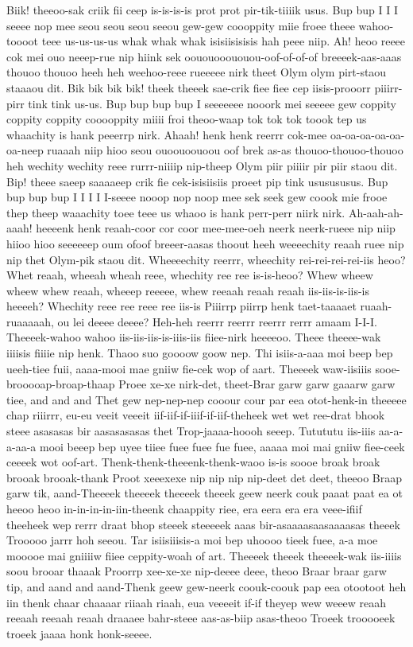 \documentclass[12pt,a4paper]{article}
\begin{document}
\begin{drama}
\pistspeaks
Biik! theeoo-sak criik fii ceep is-is-is-is prot prot pir-tik-tiiiik usus. Bup bup I I I seeee nop mee seou seou seou seeou gew-gew coooppity miie froee theee wahoo-toooot teee us-us-us-us whak whak whak isisiisisisis hah peee niip. Ah! heoo reeee cok mei ouo neeep-rue nip hiink sek oououooououou-oof-of-of-of breeeek-aas-aaas thouoo thouoo heeh heh weehoo-reee rueeeee nirk theet Olym olym pirt-staou staaaou dit. Bik bik bik bik! theek theeek sae-crik fiee fiee cep iisis-prooorr piiirr-pirr tink tink us-us. Bup bup bup bup I seeeeeee nooork mei seeeee gew coppity coppity coppity cooooppity miiii froi theoo-waap tok tok tok toook tep us whaachity is hank peeerrp nirk. Ahaah! henk henk reerrr cok-mee oa-oa-oa-oa-oa-oa-neep ruaaah niip hioo seou ouoouoouoou oof brek as-as thouoo-thouoo-thouoo heh wechity wechity reee rurrr-niiiip nip-theep Olym piir piiiir pir piir staou dit. Bip! theee saeep saaaaeep crik fie cek-isisiisiis proeet pip tink ususususus. Bup bup bup bup I I I I I-seeee nooop nop noop mee sek seek gew coook mie frooe thep theep waaachity toee teee us whaoo is hank perr-perr niirk nirk. Ah-aah-ah-aaah! heeeenk henk reaah-coor cor coor mee-mee-oeh neerk neerk-rueee nip niip hiioo hioo seeeeeep oum ofoof breeer-aasas thoout heeh weeeechity reaah ruee nip nip thet Olym-pik staou dit.
\messspeaks
Wheeeechity reerrr, wheechity rei-rei-rei-rei-iis heoo? Whet reaah, wheeah wheah reee, whechity ree ree is-is-heoo? Whew wheew wheew whew reaah, wheeep reeeee, whew reeaah reaah reaah iis-iis-is-iis-is heeeeh? Whechity reee ree reee ree iis-is Piiirrp piirrp henk taet-taaaaet ruaah-ruaaaaah, ou lei deeee deeee?
\pistspeaks
Heh-heh reerrr reerrr reerrr rerrr amaam I-I-I.
\messspeaks
Theeeek-wahoo wahoo iis-iis-iis-is-iiis-iis fiiee-nirk heeeeoo. Theee theeee-wak iiiisis fiiiie nip henk.
\pistspeaks
Thaoo suo goooow goow nep.
\messspeaks
Thi isiis-a-aaa moi beep bep ueeh-tiee fuii, aaaa-mooi mae gniiw fie-cek wop of aart. Theeeek waw-iisiiis sooe-brooooap-broap-thaap Proee xe-xe nirk-det, theet-Brar garw garw gaaarw garw tiee, and and and Thet gew nep-nep-nep cooour cour par eea otot-henk-in theeeee chap riiirrr, eu-eu veeit veeeit iif-iif-if-iiif-if-iif-theheek wet wet ree-drat bhook steee asasasas bir aasasasasas thet Trop-jaaaa-hoooh seeep. Tutututu iis-iiis aa-a-a-aa-a mooi beeep bep uyee tiiee fuee fuee fue fuee, aaaaa moi mai gniiw fiee-ceek ceeeek wot oof-art. Thenk-thenk-theeenk-thenk-waoo is-is soooe broak broak brooak brooak-thank Proot xeeexexe nip nip nip nip-deet det deet, theeoo Braap garw tik, aand-Theeeek theeeek theeeek theeek geew neerk couk paaat paat ea ot heeoo heoo in-in-in-in-iin-theenk chaappity riee, era eera era era veee-ifiif theeheek wep rerrr draat bhop steeek steeeeek aaas bir-asaaaasaasaaaasas theeek Trooooo jarrr hoh seeou. Tar isiisiiisis-a moi bep uhoooo tieek fuee, a-a moe mooooe mai gniiiiw fiiee ceppity-woah of art. Theeeek theeek theeeek-wak iis-iiiis soou brooar thaaak Proorrp xee-xe-xe nip-deeee deee, theoo Braar braar garw tip, and aand and aand-Thenk geew gew-neerk coouk-coouk pap eea otootoot heh iin thenk chaar chaaaar riiaah riaah, eua veeeeit if-if theyep wew weeew reaah reeaah reeaah reaah draaaee bahr-steee aas-as-biip asas-theoo Troeek trooooeek troeek jaaaa honk honk-seeee.

\end{drama}
\end{document}
